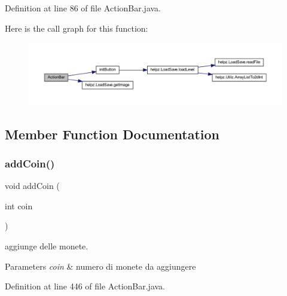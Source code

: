 Definition at line 86 of file Action\+Bar.\+java.

Here is the call graph for this function\+:\nopagebreak
\begin{figure}[H]
\begin{center}
\leavevmode
\includegraphics[width=350pt]{classui_1_1_action_bar_a4ff9099a9e2976f76bc6d0e2e5041cc6_cgraph}
\end{center}
\end{figure}


\subsection{Member Function Documentation}
\mbox{\label{classui_1_1_action_bar_a8e9e4227428708da489e0b37223377a8}} 
\subsubsection{\texorpdfstring{add\+Coin()}{addCoin()}}
{\footnotesize\ttfamily void add\+Coin (\begin{DoxyParamCaption}\item[{int}]{coin }\end{DoxyParamCaption})}



aggiunge delle monete. 


\begin{DoxyParams}{Parameters}
{\em coin} & numero di monete da aggiungere \\
\hline
\end{DoxyParams}


Definition at line 446 of file Action\+Bar.\+java.

